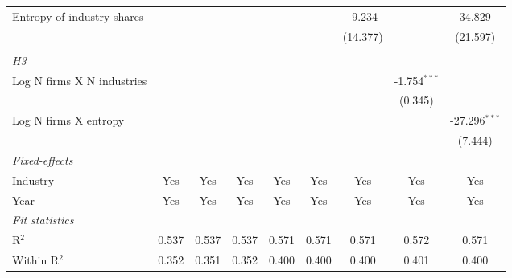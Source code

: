 \begin{tabular}{lcccccccc}
   Entropy of industry shares                            &                 &                 &                 &                  &                  & -9.234           &                  & 34.829\\   
                                                         &                 &                 &                 &                  &                  & (14.377)         &                  & (21.597)\\   
\hdashline %
\\[0.1ex] %
\emph{H3} \\ 
   Log N firms X N industries                            &                 &                 &                 &                  &                  &                  & -1.754$^{***}$   &   \\   
                                                         &                 &                 &                 &                  &                  &                  & (0.345)          &   \\   
   Log N firms X entropy                                 &                 &                 &                 &                  &                  &                  &                  & -27.296$^{***}$\\   
                                                         &                 &                 &                 &                  &                  &                  &                  & (7.444)\\   
   \midrule
   \emph{Fixed-effects}\\
   Industry                                              & Yes             & Yes             & Yes             & Yes              & Yes              & Yes              & Yes              & Yes\\  
   Year                                                  & Yes             & Yes             & Yes             & Yes              & Yes              & Yes              & Yes              & Yes\\  
   \midrule
   \emph{Fit statistics}\\
   R$^2$                                                 & 0.537           & 0.537           & 0.537           & 0.571            & 0.571            & 0.571            & 0.572            & 0.571\\  
   Within R$^2$                                          & 0.352           & 0.351           & 0.352           & 0.400            & 0.400            & 0.400            & 0.401            & 0.400\\  

\end{tabular}
